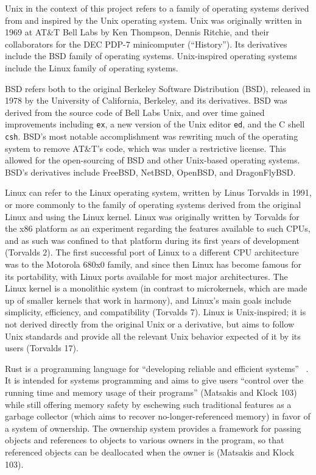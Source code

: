 \documentclass[12pt]{article}
\begin{document}
\begin{flushleft}
			Unix in the context of this project refers to a family of operating systems derived from and inspired by the Unix operating system. Unix was originally written in 1969 at AT\&T Bell Labs by Ken Thompson, Dennis Ritchie, and their collaborators for the DEC PDP-7 minicomputer (“History”). Its derivatives include the BSD family of operating systems. Unix-inspired operating systems include the Linux family of operating systems.

			BSD refers both to the original Berkeley Software Distribution (BSD), released in 1978 by the University of California, Berkeley, and its derivatives. BSD was derived from the source code of Bell Labs Unix, and over time gained improvements including \verb|ex|, a new version of the Unix editor \verb|ed|, and the C shell \verb|csh|. BSD's most notable accomplishment was rewriting much of the operating system to remove AT\&T's code, which was under a restrictive license. This allowed for the open-sourcing of BSD and other Unix-based operating systems. BSD's derivatives include FreeBSD, NetBSD, OpenBSD, and DragonFlyBSD.
			
			Linux can refer to the Linux operating system, written by Linus Torvalds in 1991, or more commonly to the family of operating systems derived from the original Linux and using the Linux kernel. Linux was originally written by Torvalds for the x86 platform as an experiment regarding the features available to such CPUs, and as such was confined to that platform during its first years of development (Torvalds 2). The first successful port of Linux to a different CPU architecture was to the Motorola 680x0 family, and since then Linux has become famous for its portability, with Linux ports available for most major architectures. The Linux kernel is a monolithic system (in contrast to microkernels, which are made up of smaller kernels that work in harmony), and Linux's main goals include simplicity, efficiency, and compatibility (Torvalds 7). Linux is Unix-inspired; it is not derived directly from the original Unix or a derivative, but aims to follow Unix standards and provide all the relevant Unix behavior expected of it by its users (Torvalds 17).
			
			Rust is a programming language for “developing reliable and efficient systems” ~\cite{rust}. It is intended for systems programming and aims to give users “control over the running time and memory usage of their programs” (Matsakis and Klock 103) while still offering memory safety by eschewing such traditional features as a garbage collector (which aims to recover no-longer-referenced memory) in favor of a system of ownership. The ownership system provides a framework for passing objects and references to objects to various owners in the program, so that referenced objects can be deallocated when the owner is (Matsakis and Klock 103).
			

\end{flushleft}
\end{document}
